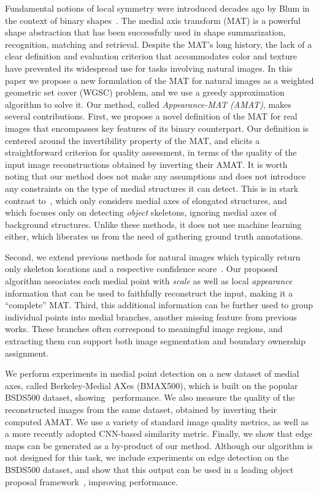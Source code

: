 \documentclass[10pt,twocolumn,letterpaper]{article}
\begin{document}
Fundamental notions of local symmetry were introduced decades ago by Blum in the context 
of binary shapes~\cite{blum1967transformation,blum1973biological}.
The medial axis transform (MAT) is a powerful shape abstraction that has been successfully
used in shape summarization, recognition, matching and retrieval. 
Despite the MAT's long history, the lack of a clear definition and evaluation criterion 
that accommodates color and texture have prevented its widespread use for tasks involving natural images.
In this paper we propose a new formulation of the MAT for natural images as a 
weighted geometric set cover (WGSC) problem, and we use a greedy approximation algorithm to solve it.
Our method, called \emph{Appearance-MAT (AMAT)}, makes several contributions.
First, we propose a novel definition of the MAT for real images that encompasses key features of its 
binary counterpart. Our definition is centered around the invertibility property of the MAT, and elicits 
a straightforward criterion for quality assessment, in terms of the quality of the input image reconstructions
obtained by inverting their AMAT.
It is worth noting that our method does not make any assumptions and does not introduce any constraints on the
type of medial structures it can detect.
This is in stark contrast to~\cite{tsogkas2012learning}, which only considers medial axes of elongated structures,
and~\cite{shen2016object} which focuses only on detecting \emph{object} skeletons, ignoring medial axes of 
background structures.
Unlike these methods, it does not use machine learning either, which liberates us from the need of gathering
ground truth annotations.

Second, we extend previous methods for natural images which typically return only skeleton 
locations and a respective confidence score~\cite{tsogkas2012learning,shen2016object}.
Our proposed algorithm associates each medial point with \emph{scale} as well as local \emph{appearance} information
that can be used to faithfully reconstruct the input, making it a ``complete'' MAT.
Third, this additional information can be further used to group individual points into medial branches,
another missing feature from previous works.
These branches often correspond to meaningful image regions, and extracting them can support both image segmentation
and boundary ownership assignment.

We perform experiments in medial point detection on a new dataset of medial axes, called
Berkeley-Medial AXes (BMAX500), which is built on the popular BSDS500 dataset, showing \sota\ performance.
We also measure the quality of the reconstructed images from the same dataset, obtained by inverting their computed AMAT. 
We use a variety of standard image quality metrics, as well as a more recently adopted CNN-based similarity metric.
Finally, we show that edge maps can be generated as a by-product of our method.
Although our algorithm is not designed for this task, we include experiments on edge detection on the BSDS500 dataset,
and show that this output can be used in a leading object proposal framework~\cite{zitnick2014edge},
improving performance.
\end{document}
